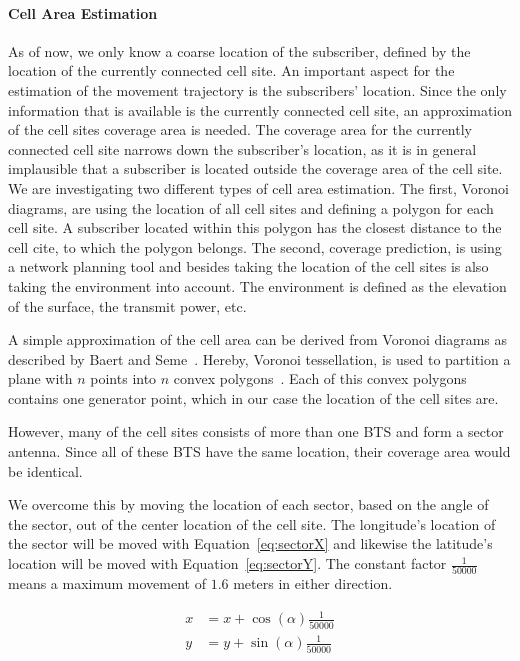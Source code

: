 \documentclass[twocolumn]{bmcart}%
\begin{document}
\paragraph*{Cell Area Estimation}
As of now, we only know a coarse location of the subscriber, defined by the location of the currently connected cell site. An important aspect for the estimation of the movement trajectory is the subscribers' location. Since the only information that is available is the currently connected cell site, an approximation of the cell sites coverage area is needed. The coverage area for the currently connected cell site narrows down the subscriber's location, as it is in general implausible that a subscriber is located outside the coverage area of the cell site. We are investigating two different types of cell area estimation. The first, Voronoi diagrams, are using the location of all cell sites and defining a polygon for each cell site. A subscriber located within this polygon has the closest distance to the cell cite, to which the polygon belongs. The second, coverage prediction, is using a network planning tool and besides taking the location of the cell sites is also taking the environment into account. The environment is defined as the elevation of the surface, the transmit power, etc. \newline


A simple approximation of the cell area can be derived from Voronoi diagrams as described by Baert and Seme~\cite{Baert2004}. Hereby, Voronoi tessellation, is used to partition a plane with $n$ points into $n$ convex polygons~\cite{Aurenhammer1991}. Each of this convex polygons contains one generator point, which in our case the location of the cell sites are. %

However, many of the cell sites consists of more than one BTS and form a sector antenna. Since all of these BTS have the same location, their coverage area would be identical.

We overcome this by moving the location of each sector, based on the angle of the sector, out of the center location of the cell site. The longitude's location of the sector will be moved with Equation~\ref{eq:sectorX} and likewise the latitude's location will be moved with Equation~\ref{eq:sectorY}. The constant factor $\frac{1}{50000}$ means a maximum movement of $1.6$ meters in either direction.

\begin{align}
	x & =x+\cos(\alpha)\frac{1}{50000}\label{eq:sectorX}  \\
	y & =y+\sin(\alpha)\frac{1}{50000} \label{eq:sectorY} 
\end{align}
\newline
\end{document}
